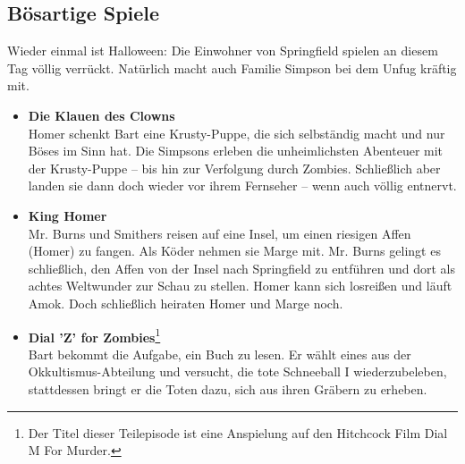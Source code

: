 \subsection{Bösartige Spiele}\label{9F04}
Wieder einmal ist Halloween: Die Einwohner von Springfield spielen an diesem Tag völlig verrückt. Natürlich macht auch Familie Simpson bei dem Unfug kräftig mit. 
\begin{itemize}
	\item \textbf{Die Klauen des Clowns}\\ Homer schenkt Bart eine Krusty-Puppe, die sich selbständig macht und nur Böses im Sinn hat. Die Simpsons erleben die unheimlichsten Abenteuer mit der Krusty-Puppe -- bis hin zur Verfolgung durch Zombies. Schließlich aber landen sie dann doch wieder vor ihrem Fernseher -- wenn auch völlig entnervt.
	\item \textbf{King Homer}\\ Mr. Burns und Smithers reisen auf eine Insel, um einen riesigen Affen (Homer) zu fangen. Als Köder nehmen sie Marge mit. Mr. Burns gelingt es schließlich, den Affen von der Insel nach Springfield zu entführen und dort als achtes Weltwunder zur Schau zu stellen. Homer kann sich losreißen und läuft Amok. Doch schließlich heiraten Homer und Marge noch.
  \item \textbf{Dial 'Z' for Zombies}\footnote{Der Titel dieser Teilepisode ist eine Anspielung auf den Hitchcock Film \glqq Dial M For Murder\grqq .}\\ Bart bekommt die Aufgabe, ein Buch zu lesen. Er wählt eines aus der Okkultismus-Abteilung und versucht, die tote Schneeball I wiederzubeleben, stattdessen bringt er die Toten dazu, sich aus ihren Gräbern zu erheben.
\end{itemize}

